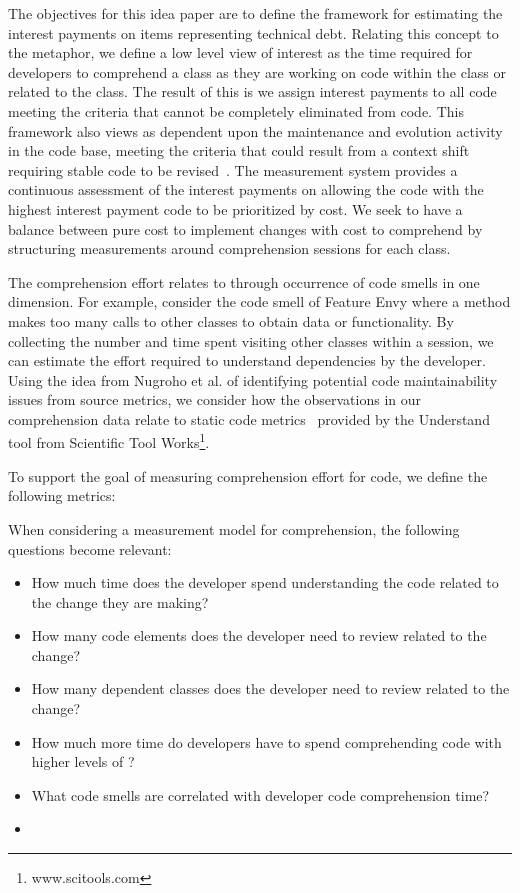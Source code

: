 The objectives for this idea paper are to define the framework for estimating the interest payments on items representing technical debt.  Relating this concept to the \TD  metaphor, we define a low level view of interest as the time required for developers to comprehend a class as they are working on code within the class or related to the class.   The result of this is we assign interest payments to all code meeting the criteria that \TD cannot be completely eliminated from code.  This framework also views \TD as dependent upon the maintenance and evolution activity in the code base, meeting the criteria that \TD could result from a context shift requiring stable code to be revised~\cite{Ozkaya2012Technical}. The measurement system provides a continuous assessment of the interest payments on \TD allowing the code with the highest interest payment code to be prioritized by cost.  We seek to have a balance between pure cost to implement changes with cost to comprehend by structuring measurements around comprehension sessions for each class.

The comprehension effort relates to \TD through occurrence of code smells in one dimension.  For example, consider the code smell of Feature Envy where a method makes too many calls to other classes to obtain data or functionality.  By collecting the number and time spent visiting other classes within a session, we can estimate the effort required to understand dependencies by the developer.  Using the idea from Nugroho et al. of identifying potential code maintainability issues from source metrics, we consider how the observations in our comprehension data relate to static code metrics~\cite{Nugroho2011Empirical} provided by the Understand tool from Scientific Tool Works\footnote{www.scitools.com}.  



To support the goal of measuring comprehension effort for code, we define the following metrics:

When considering a measurement model for comprehension, the following questions become relevant:

\begin{itemize}
	\item[] How much time does the developer spend understanding the code related to the change they are making?
	\item[] How many code elements does the developer need to review related to the change?
	\item[] How many dependent classes does the developer need to review related to the change?
	\item[] How much more time do developers have to spend comprehending code with higher levels of \TD?
	\item[] What code smells are correlated with developer code comprehension time?
	\item[] 
\end{itemize}

